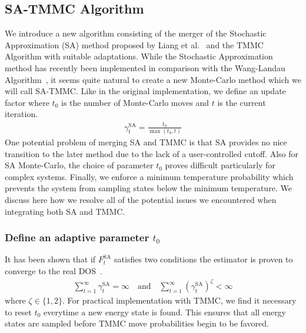 \documentclass[letterpaper,twocolumn,amsmath,amssymb,pre,aps,10pt]{revtex4-1}
\begin{document}
\subsection{SA-TMMC Algorithm} We introduce a new algorithm consisting
of the merger of the Stochastic Approximation (SA) method proposed by
Liang et al.~\cite{liang2007stochastic} and the TMMC Algorithm with
suitable adaptations.  While the Stochastic Approximation method has
recently been implemented in comparison with the Wang-Landau
Algorithm~\cite{werlich2015stochastic, schneider2017convergence}, it
seems quite natural to create a new Monte-Carlo method which we will
call SA-TMMC.  Like in the original implementation, we define an update
factor where $t_0$ is the number of Monte-Carlo moves and $t$ is the
current iteration. \begin{align} \gamma_{t}^{\text{SA}} =
\frac{t_0}{\max(t_0,t)} \end{align} One potential problem of merging SA
and TMMC is that SA provides no nice transition to the later method due
to the lack of a user-controlled cutoff.  Also for SA Monte-Carlo, the
choice of parameter $t_0$ proves difficult particularly for complex
systems.  Finally, we enforce a minimum temperature probability which
prevents the system from sampling states below the minimum temperature.
We discuss here how we resolve all of the potential issues we
encountered when integrating both SA and TMMC.

\subsubsection{Define an adaptive parameter $t_0$}
It has been shown that if $F_{t}^{\text{SA}}$ satisfies two conditions
the estimator is proven to converge to the real
DOS~\cite{liang2006theory, liang2007stochastic}.
\begin{align}
\sum_{t=1}^\infty \gamma_{t}^{\text{SA}} = \infty \quad\textrm{and}\quad
\sum_{t=1}^\infty (\gamma_{t}^{\text{SA}})^\zeta < \infty
\end{align}
where $\zeta \in \{1,2\}$.  For practical implementation with TMMC, we
find it necessary to reset $t_0$ everytime a new energy state is found.
This ensures that all energy states are sampled before TMMC move
probabilities begin to be favored.
\end{document}
